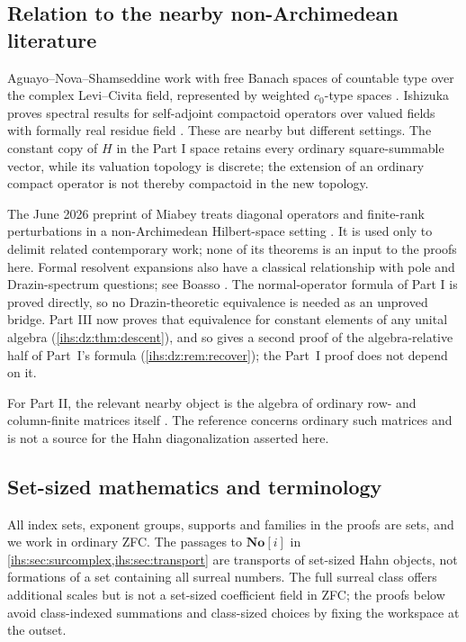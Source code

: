 \documentclass[11pt,a4paper]{article}
\numberwithin{equation}{section}
\theoremstyle{definition}
\theoremstyle{remark}
\newcommand{\No}{\mathbf{No}}
\begin{document}
\subsection{Relation to the nearby non-Archimedean literature}\label{ihs:sec:nearby}
Aguayo--Nova--Shamseddine work with free Banach spaces of countable type
over the complex Levi--Civita field, represented by weighted $c_0$-type
spaces \cite{ANS}. Ishizuka proves spectral results for self-adjoint
compactoid operators over valued fields with formally real residue field
\cite{Ishizuka}. These are nearby but different settings. The constant copy
of $H$ in the Part I space retains every ordinary square-summable vector,
while its valuation topology is discrete; the extension of an ordinary
compact operator is not thereby compactoid in the new topology.

The June 2026 preprint of Miabey treats diagonal operators and finite-rank
perturbations in a non-Archimedean Hilbert-space setting \cite{Miabey}. It
is used only to delimit related contemporary work; none of its theorems is
an input to the proofs here. Formal resolvent expansions also have a
classical relationship with pole and Drazin-spectrum questions; see Boasso
\cite{Boasso}. The normal-operator formula of Part I is proved directly, so
no Drazin-theoretic equivalence is needed as an unproved bridge. Part III
now proves that equivalence for constant elements of any unital algebra
(\cref{ihs:dz:thm:descent}), and so gives a second proof of the
algebra-relative half of Part~I's formula (\cref{ihs:dz:rem:recover}); the
Part~I proof does not depend on it.

For Part II, the relevant nearby object is the algebra of ordinary row- and
column-finite matrices itself \cite{ago}. The reference concerns ordinary
such matrices and is not a source for the Hahn diagonalization asserted
here.

\subsection{Set-sized mathematics and terminology}\label{ihs:sec:setsized}
All index sets, exponent groups, supports and families in the proofs are
sets, and we work in ordinary ZFC. The passages to $\No[i]$ in
\cref{ihs:sec:surcomplex,ihs:sec:transport} are transports of set-sized Hahn
objects, not formations of a set containing all surreal numbers. The full
surreal class offers additional scales but is not a set-sized coefficient
field in ZFC; the proofs below avoid class-indexed summations and
class-sized choices by fixing the workspace at the outset.
\end{document}

